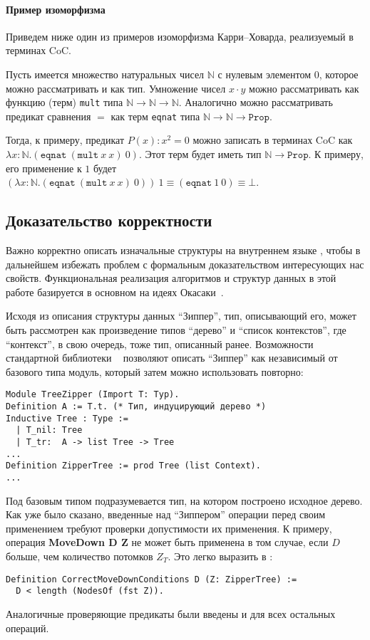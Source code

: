 \paragraph{Пример изоморфизма}
Приведем ниже один из примеров изоморфизма Карри--Ховарда, реализуемый в терминах CoC.

Пусть имеется множество натуральных чисел $\mathbb{N}$ с нулевым элементом $0$, которое можно рассматривать и как тип. Умножение чисел $x \cdot y$ можно рассматривать как функцию (терм) \texttt{mult} типа $\mathbb{N} \rightarrow \mathbb{N} \rightarrow \mathbb{N}$. Аналогично можно рассматривать предикат сравнения $=$ как терм \texttt{eqnat} типа $\mathbb{N} \rightarrow \mathbb{N} \rightarrow \texttt{Prop}$. 

Тогда, к примеру, предикат $P(x):x^2 = 0$ можно записать в терминах CoC как $\lambda x:\mathbb{N}. (\texttt{eqnat}\ (\texttt{mult}\ x\ x)\ 0)$. Этот терм будет иметь тип $\mathbb{N} \rightarrow \texttt{Prop}$. К примеру, его применение к $1$ будет $(\lambda x:\mathbb{N}. (\texttt{eqnat}\ (\texttt{mult}\ x\ x)\ 0))\ 1 \equiv (\texttt{eqnat}\ 1\ 0) \equiv \bot$.

\subsection{Доказательство корректности}

Важно корректно описать изначальные структуры на внутреннем языке \tcoq, чтобы в дальнейшем избежать проблем с формальным доказательством интересующих нас свойств. Функциональная реализация алгоритмов и структур данных в этой работе базируется в основном на идеях Окасаки~\autocite{Okasaki1996}.

Исходя из описания структуры данных ``Зиппер'', тип, описывающий его, может быть рассмотрен как произведение типов ``дерево'' и ``список контекстов'', где ``контекст'', в свою очередь, тоже тип, описанный ранее. Возможности стандартной библиотеки \tcoq~ позволяют описать ``Зиппер'' как независимый от базового типа модуль, который затем можно использовать повторно:

\begin{Verbatim}[fontsize=\small]
Module TreeZipper (Import T: Typ).
Definition A := T.t. (* Тип, индуцирующий дерево *)
Inductive Tree : Type :=
  | T_nil: Tree
  | T_tr:  A -> list Tree -> Tree
...
Definition ZipperTree := prod Tree (list Context).
...
\end{Verbatim}

Под базовым типом подразумевается тип, на котором построено исходное дерево. Как уже было сказано, введенные над ``Зиппером'' операции перед своим применением требуют проверки допустимости их применения. К примеру, операция \textbf{MoveDown D Z} не может быть применена в том случае, если $D$ больше, чем количество потомков $Z_T$. Это легко выразить в \tcoq:
\begin{Verbatim}[fontsize=\small]
Definition CorrectMoveDownConditions D (Z: ZipperTree) :=
  D < length (NodesOf (fst Z)).
\end{Verbatim}
Аналогичные проверяющие предикаты были введены и для всех остальных операций.

